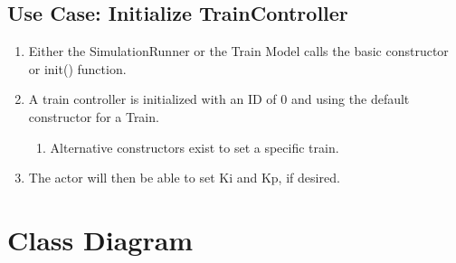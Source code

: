 \documentclass{scrreprt}
\begin{document}
\subsection{Use Case: Initialize TrainController}
\begin{enumerate}
	\item Either the SimulationRunner or the Train Model calls the basic constructor or init() function.
	\item A train controller is initialized with an ID of 0 and using the default constructor for a Train.
	\begin{enumerate}
		\item Alternative constructors exist to set a specific train.
	\end{enumerate}
	\item The actor will then be able to set Ki and Kp, if desired.
\end{enumerate}


\section{Class Diagram}
\end{document}
